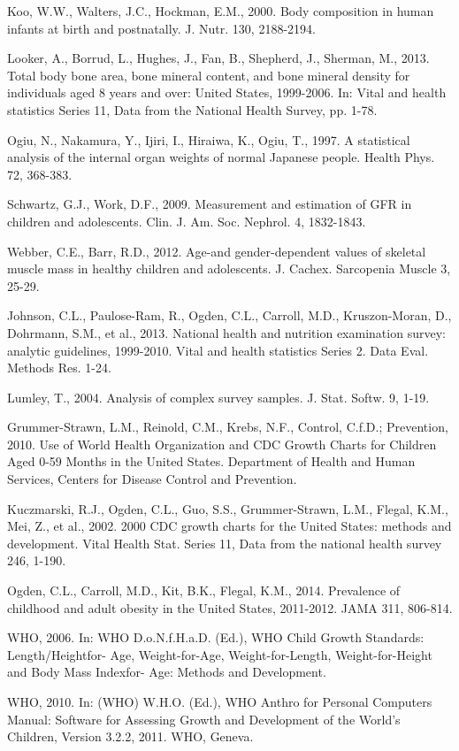 \documentclass[a4paper]{book}
\begin{document}
\begin{References}
Koo, W.W., Walters, J.C., Hockman, E.M., 2000. Body composition in human infants at
birth and postnatally. J. Nutr. 130, 2188-2194.

Looker, A., Borrud, L., Hughes, J., Fan, B., Shepherd, J., Sherman, M., 2013. Total body
bone area, bone mineral content, and bone mineral density for individuals aged 8
years and over: United States, 1999-2006. In: Vital and health statistics Series 11,
Data from the National Health Survey, pp. 1-78.

Ogiu, N., Nakamura, Y., Ijiri, I., Hiraiwa, K., Ogiu, T., 1997. A statistical analysis of the
internal organ weights of normal Japanese people. Health Phys. 72, 368-383.

Schwartz, G.J., Work, D.F., 2009. Measurement and estimation of GFR in children and
adolescents. Clin. J. Am. Soc. Nephrol. 4, 1832-1843.

Webber, C.E., Barr, R.D., 2012. Age-and gender-dependent values of skeletal muscle mass
in healthy children and adolescents. J. Cachex. Sarcopenia Muscle 3, 25-29.

Johnson, C.L., Paulose-Ram, R., Ogden, C.L., Carroll, M.D., Kruszon-Moran, D.,
Dohrmann, S.M., et al., 2013. National health and nutrition examination survey:
analytic guidelines, 1999-2010. Vital and health statistics Series 2. Data Eval.
Methods Res. 1-24.

Lumley, T., 2004. Analysis of complex survey samples. J. Stat. Softw. 9, 1-19.

Grummer-Strawn, L.M., Reinold, C.M., Krebs, N.F., Control, C.f.D.; Prevention, 2010. Use
of World Health Organization and CDC Growth Charts for Children Aged 0-59
Months in the United States. Department of Health and Human Services, Centers for
Disease Control and Prevention.

Kuczmarski, R.J., Ogden, C.L., Guo, S.S., Grummer-Strawn, L.M., Flegal, K.M., Mei, Z.,
et al., 2002. 2000 CDC growth charts for the United States: methods and development.
Vital Health Stat. Series 11, Data from the national health survey 246, 1-190.

Ogden, C.L., Carroll, M.D., Kit, B.K., Flegal, K.M., 2014. Prevalence of childhood and
adult obesity in the United States, 2011-2012. JAMA 311, 806-814.

WHO, 2006. In: WHO D.o.N.f.H.a.D. (Ed.), WHO Child Growth Standards: Length/Heightfor-
Age, Weight-for-Age, Weight-for-Length, Weight-for-Height and Body Mass Indexfor-
Age: Methods and Development.

WHO, 2010. In: (WHO) W.H.O. (Ed.), WHO Anthro for Personal Computers Manual:
Software for Assessing Growth and Development of the World's Children, Version
3.2.2, 2011. WHO, Geneva.


\end{References}
\end{document}
